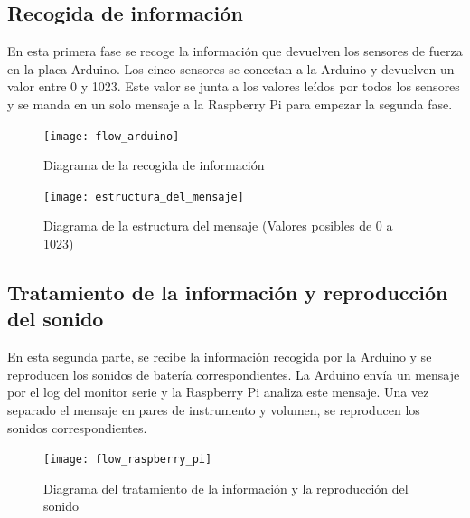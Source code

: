         \subsection{Recogida de información} %
        \label{sub:RecogidaDeInformacion}

            En esta primera fase se recoge la información que devuelven los sensores de fuerza en la placa Arduino. Los
            cinco sensores se conectan a la Arduino y devuelven un valor entre 0 y 1023. Este valor se junta a los
            valores leídos por todos los sensores y se manda en un solo mensaje a la Raspberry Pi para empezar la
            segunda fase.

            \newpage

            \begin{figure}[ht]
                \centering
                \texttt{[image: flow\_arduino]}
                \caption{Diagrama de la recogida de información \label{fig:DiagramaRecogida}}
            \end{figure}

            \begin{figure}[ht]
                \centering
                \texttt{[image: estructura\_del\_mensaje]}
                \caption{Diagrama de la estructura del mensaje (Valores posibles de 0 a
                1023) \label{fig:DiagramaEstrutura}}
            \end{figure}


        \subsection{Tratamiento de la información y reproducción del sonido} %
        \label{sub:TratamientoDeLaInformacionYReproduccionDelSonido}

            En esta segunda parte, se recibe la información recogida por la Arduino y se reproducen los sonidos de
            batería correspondientes. La Arduino envía un mensaje por el log del monitor serie y la Raspberry Pi analiza
            este mensaje. Una vez separado el mensaje en pares de instrumento y volumen, se reproducen los sonidos
            correspondientes.

            \begin{figure}[ht]
                \centering
                \texttt{[image: flow\_raspberry\_pi]}
                \caption{Diagrama del tratamiento de la información y la reproducción del
                sonido \label{fig:DiagramaTratamiento}}
            \end{figure}

